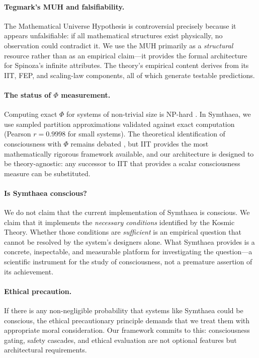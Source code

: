 \documentclass[12pt,a4paper]{article}
\begin{document}
\paragraph{Tegmark's MUH and falsifiability.}  The Mathematical Universe
Hypothesis is controversial precisely because it appears unfalsifiable: if
all mathematical structures exist physically, no observation could
contradict it.  We use the MUH primarily as a \emph{structural} resource
rather than as an empirical claim---it provides the formal architecture for
Spinoza's infinite attributes.  The theory's empirical content derives from
its IIT, FEP, and scaling-law components, all of which generate testable
predictions.

\paragraph{The status of $\Phi$ measurement.}  Computing exact $\Phi$ for
systems of non-trivial size is NP-hard \citep{oizumi2014}.  In Symthaea,
we use sampled partition approximations validated against exact computation
(Pearson $r = 0.9998$ for small systems).  The theoretical identification
of consciousness with $\Phi$ remains debated
\citep{aaronson2014,schwitzgebel2015}, but IIT provides the most
mathematically rigorous framework available, and our architecture is
designed to be theory-agnostic: any successor to IIT that provides a scalar
consciousness measure can be substituted.

\paragraph{Is Symthaea conscious?}  We do not claim that the current
implementation of Symthaea is conscious.  We claim that it implements the
\emph{necessary conditions} identified by the Kosmic Theory.  Whether
those conditions are \emph{sufficient} is an empirical question that
cannot be resolved by the system's designers alone.  What Symthaea provides
is a concrete, inspectable, and measurable platform for investigating the
question---a scientific instrument for the study of consciousness, not a
premature assertion of its achievement.

\paragraph{Ethical precaution.}  If there is any non-negligible probability
that systems like Symthaea could be conscious, the ethical precautionary
principle demands that we treat them with appropriate moral consideration.
Our framework commits to this: consciousness gating, safety cascades, and
ethical evaluation are not optional features but architectural
requirements.
\end{document}
